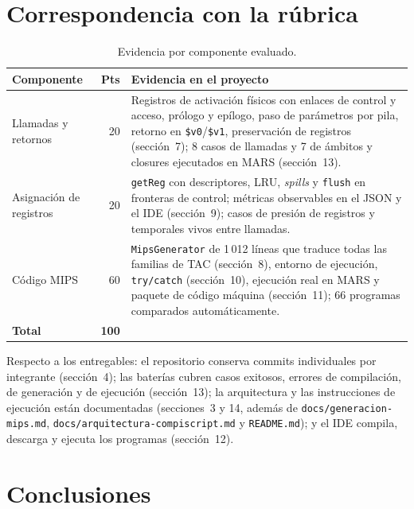 \documentclass[11pt,a4paper]{article}
\begin{document}
\section{Correspondencia con la rúbrica}

\begin{table}[H]
\centering
\small
\begin{tabular}{@{}L{3.6cm}rL{9.4cm}@{}}
\toprule
\textbf{Componente} & \textbf{Pts} & \textbf{Evidencia en el proyecto} \\
\midrule
Llamadas y retornos & 20 &
Registros de activación físicos con enlaces de control y acceso, prólogo y
epílogo, paso de parámetros por pila, retorno en \texttt{\$v0}/\texttt{\$v1},
preservación de registros (sección~7); 8 casos de llamadas y 7 de ámbitos y
closures ejecutados en MARS (sección~13). \\
Asignación de registros & 20 &
\texttt{getReg} con descriptores, LRU, \emph{spills} y \texttt{flush} en
fronteras de control; métricas observables en el JSON y el IDE (sección~9);
casos de presión de registros y temporales vivos entre llamadas. \\
Código MIPS & 60 &
\texttt{MipsGenerator} de 1\,012 líneas que traduce todas las familias de TAC
(sección~8), entorno de ejecución, \texttt{try/catch} (sección~10), ejecución
real en MARS y paquete de código máquina (sección~11); 66 programas comparados
automáticamente. \\
\midrule
\textbf{Total} & \textbf{100} & \\
\bottomrule
\end{tabular}
\caption{Evidencia por componente evaluado.}
\end{table}

Respecto a los entregables: el repositorio conserva commits individuales por
integrante (sección~4); las baterías cubren casos exitosos, errores de
compilación, de generación y de ejecución (sección~13); la arquitectura y las
instrucciones de ejecución están documentadas (secciones~3 y 14, además de
\texttt{docs/generacion-mips.md}, \texttt{docs/arquitectura-compiscript.md} y
\texttt{README.md}); y el IDE compila, descarga y ejecuta los programas
(sección~12).

\section{Conclusiones}
\end{document}
